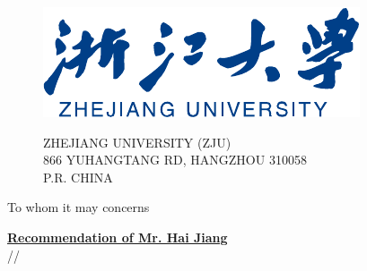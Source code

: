 \documentclass{article}
\renewcommand{\today}{\number\year /\number\month /\number\day}
\begin{document}
\begin{figure}[h]
	\begin{minipage}{0.4\linewidth}
		\includegraphics[width=\textwidth]{zju_2.pdf}
	\end{minipage}
	\hfill
	\begin{minipage}{0.48\linewidth}
	\begin{flushright}%
			{\footnotesize ZHEJIANG UNIVERSITY (ZJU)}\\
			{\footnotesize 866 YUHANGTANG RD, HANGZHOU 310058}\\
			{\footnotesize P.R. CHINA}
	\end{flushright}
	\end{minipage}
\end{figure}

\vspace{7pt}

\begin{FlushLeft}
To whom it may concerns
\end{FlushLeft}


\underline{\textbf{Recommendation of Mr. Hai Jiang}}\\
\today \bigskip\\ %
\vspace{-3em}




\bigskip %
\vspace{5pt}

\end{document}
